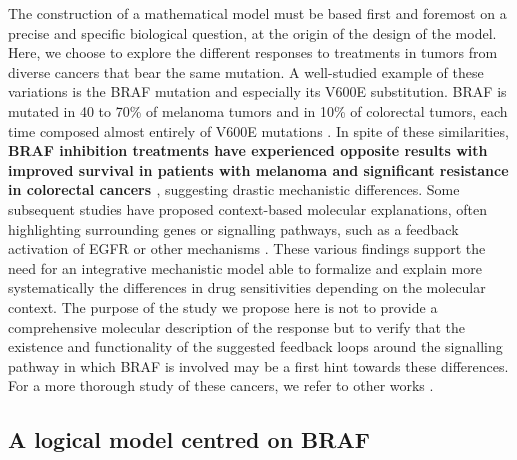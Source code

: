 \documentclass[a4paper,12pt,twoside,onecolumn,openright,final,oldfontcommands]{memoir}
\begin{document}
The construction of a mathematical model must be based first and
foremost on a precise and specific biological question, at the origin of
the design of the model. Here, we choose to explore the different
responses to treatments in tumors from diverse cancers that bear the
same mutation. A well-studied example of these variations is the BRAF
mutation and especially its V600E substitution. BRAF is mutated in 40 to
70\% of melanoma tumors and in 10\% of colorectal tumors, each time
composed almost entirely of V600E mutations
\citep{cantwell2011brafv600e}. In spite of these similarities,
\textbf{BRAF inhibition treatments have experienced opposite results
with improved survival in patients with melanoma
\citep{chapman2011improved} and significant resistance in colorectal
cancers \citep{kopetz2010plx4032}}, suggesting drastic mechanistic
differences. Some subsequent studies have proposed context-based
molecular explanations, often highlighting surrounding genes or
signalling pathways, such as a feedback activation of EGFR
\citep{prahallad2012unresponsiveness} or other mechanisms
\citep{poulikakos2011raf, sun2014reversible}. These various findings
support the need for an integrative mechanistic model able to formalize
and explain more systematically the differences in drug sensitivities
depending on the molecular context. The purpose of the study we propose
here is not to provide a comprehensive molecular description of the
response but to verify that the existence and functionality of the
suggested feedback loops around the signalling pathway in which BRAF is
involved \citep{prahallad2012unresponsiveness} may be a first hint
towards these differences. For a more thorough study of these cancers,
we refer to other works
\citep{eduati2017drug, baur2020connecting, cho2016attractor}.

\subsection{A logical model centred on
BRAF}\label{a-logical-model-centred-on-braf}
\end{document}
